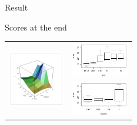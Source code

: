 \documentclass[12pt, notes=show]{beamer}
\begin{document}
\begin{frame}{Result}
    \vspace{-1.5cm}

    \begin{table}

     \tiny Scores at the end
	\begin{tabular}{c m{2.5cm}}
	   \multirow{2}{2.5cm}{\includegraphics[height=2.5cm]{../images/ScoreMuCopyAll.pdf}} &
	   \vspace{1cm}\includegraphics[height=1.5cm]{../images/ScoreCopyAll.pdf}\\
	    & \includegraphics[height=1.5cm]{../images/ScoreMuAll.pdf} \\
	\end{tabular}
    \end{table}
\end{frame}
\end{document}
